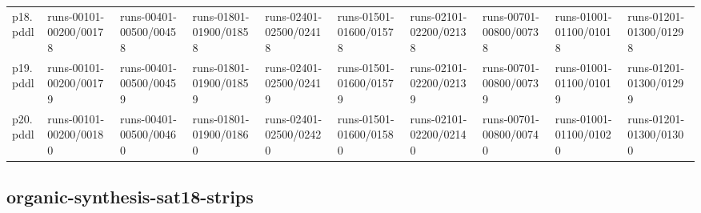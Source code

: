 \documentclass{article}
\begin{document}
\begin{tabular}{@{}lrrrrrrrrr@{}}
p18.pddl & \multicolumn{1}{|l|}{runs-00101-00200/00178} & \multicolumn{1}{|l|}{runs-00401-00500/00458} & \multicolumn{1}{|l|}{runs-01801-01900/01858} & \multicolumn{1}{|l|}{runs-02401-02500/02418} & \multicolumn{1}{|l|}{runs-01501-01600/01578} & \multicolumn{1}{|l|}{runs-02101-02200/02138} & \multicolumn{1}{|l|}{runs-00701-00800/00738} & \multicolumn{1}{|l|}{runs-01001-01100/01018} & \multicolumn{1}{|l|}{runs-01201-01300/01298} \\
p19.pddl & \multicolumn{1}{|l|}{runs-00101-00200/00179} & \multicolumn{1}{|l|}{runs-00401-00500/00459} & \multicolumn{1}{|l|}{runs-01801-01900/01859} & \multicolumn{1}{|l|}{runs-02401-02500/02419} & \multicolumn{1}{|l|}{runs-01501-01600/01579} & \multicolumn{1}{|l|}{runs-02101-02200/02139} & \multicolumn{1}{|l|}{runs-00701-00800/00739} & \multicolumn{1}{|l|}{runs-01001-01100/01019} & \multicolumn{1}{|l|}{runs-01201-01300/01299} \\
p20.pddl & \multicolumn{1}{|l|}{runs-00101-00200/00180} & \multicolumn{1}{|l|}{runs-00401-00500/00460} & \multicolumn{1}{|l|}{runs-01801-01900/01860} & \multicolumn{1}{|l|}{runs-02401-02500/02420} & \multicolumn{1}{|l|}{runs-01501-01600/01580} & \multicolumn{1}{|l|}{runs-02101-02200/02140} & \multicolumn{1}{|l|}{runs-00701-00800/00740} & \multicolumn{1}{|l|}{runs-01001-01100/01020} & \multicolumn{1}{|l|}{runs-01201-01300/01300} \\
\end{tabular}

\hypertarget{run_dir-organic-synthesis-sat18-strips}{}
\subsection*{organic-synthesis-sat18-strips}
\end{document}
